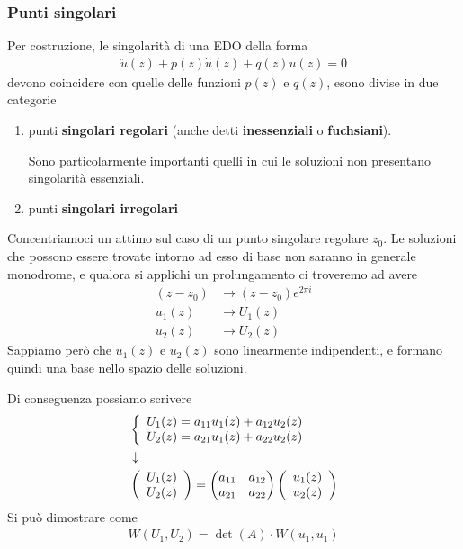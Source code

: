 \newpage

\subsubsection{Punti singolari}

Per costruzione, le singolarità di una EDO della forma
\begin{align}
	\ddot{u}(z) + p(z) \dot{u}(z) + q(z)u(z) = 0
\end{align}
devono coincidere con quelle delle funzioni $p(z)$ e $q(z)$, esono divise in due categorie
\begin{enumerate}
	\item punti \textbf{singolari regolari} (anche detti \textbf{inessenziali} o \textbf{fuchsiani}).
	
	Sono particolarmente importanti quelli in cui le soluzioni non presentano singolarità essenziali.
	\item punti \textbf{singolari irregolari}
\end{enumerate}
Concentriamoci un attimo sul caso di un punto singolare regolare $z_0$. Le soluzioni che possono essere trovate intorno ad esso di base non saranno in generale monodrome, e qualora si applichi un prolungamento ci troveremo ad avere
\begin{align}
	(z-z_0) &\to (z-z_0)e^{2\pi i}\\
	u_1(z)  &\to U_1(z)\\
	u_2(z)  &\to U_2(z)
\end{align}
Sappiamo però che $u_1(z)$ e $u_2(z)$ sono linearmente indipendenti, e formano quindi una base nello spazio delle soluzioni.

Di conseguenza possiamo scrivere
\begin{align}
	&\left\{ \begin{array}{cc} U_1(z) = a_{11} u_1(z) + a_{12} u_2(z)\\ U_2(z) = a_{21} u_1(z) + a_{22} u_2(z) \end{array} \right.\\ &\downarrow \nonumber \\
	&\left(
	 \begin{array}{c}
		 U_1(z)\\
		 U_2(z)
	 \end{array}\right) = 
	 \begin{pmatrix}
		 a_{11} & a_{12}\\
		 a_{21} & a_{22}
	 \end{pmatrix} 	\left(
     \begin{array}{c}
		 u_1(z)\\
		 u_2(z)
	\end{array}\right)
\end{align}
Si può dimostrare come
\begin{align}
	W(U_1,U_2) = \det(A) \cdot W(u_1, u_1)
\end{align}

